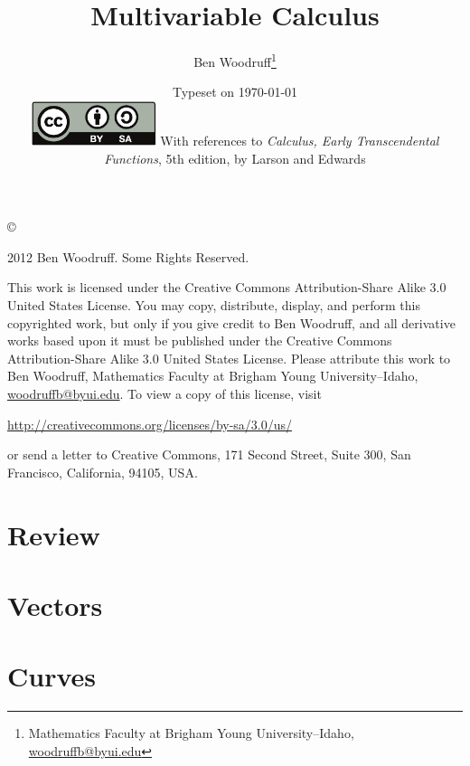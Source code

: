 \documentclass[letterpaper,oneside]{book}%
\newcommand{\wrapup}{
\bmw{\section{Wrap Up}
Once you have finished the problems in the section and feel comfortable with the ideas, create a short one page lesson plan that contains examples of the key ideas.  You will get a chance to teach from this lesson plan prior to taking the exam. Then log on to Brainhoney and download the quiz. Once you have taken the quiz, you can upload your work back to brainhoney and then download the key to see how you did. If you still need to work on mastering some of the ideas, please do so and then demonstrate your mastery though the quiz corrections.}
}
\newcommand{\bmw}[1]{}
\newcommand{\larsonfive}[1]{#1}
\theoremstyle{plain}
\theoremstyle{box}
\theoremstyle{problem}
\begin{document}
\frontmatter
\title{Multivariable Calculus}
\author{Ben Woodruff\thanks{Mathematics Faculty at Brigham Young
    University--Idaho, \url{woodruffb@byui.edu}}}
\date{Typeset on \today\\
\vfill
\includegraphics[height=1.3cm]{by-sa}
\vfill
\larsonfive{With references to \emph{Calculus, Early Transcendental
    Functions}, 5th edition, by Larson and Edwards}}
\maketitle
\thispagestyle{empty}
\noindent\copyright{ 2012 Ben Woodruff.  Some Rights Reserved.\\

\bigskip

\noindent This work is licensed under the Creative Commons Attribution-Share Alike 3.0 United States License.  You may copy, distribute, display, and perform this copyrighted work, but only if you give credit to Ben Woodruff, and all derivative works based upon it must be published under the Creative Commons Attribution-Share Alike 3.0 United States License. Please attribute this work to Ben Woodruff, Mathematics Faculty at Brigham Young University--Idaho, \url{woodruffb@byui.edu}. To view a copy of this license, visit
\begin{center}
  \url{http://creativecommons.org/licenses/by-sa/3.0/us/}
\end{center}
or send a letter to Creative Commons, 171 Second Street, Suite 300, San Francisco, California, 94105, USA.}
\tableofcontents

\mainmatter

\chapter{Review}

\wrapup

\chapter{Vectors}

\wrapup


\chapter{Curves}

\wrapup
\end{document}
